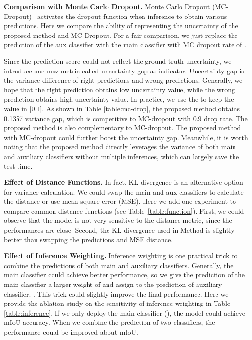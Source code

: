 \noindent\textbf{Comparison with Monte Carlo Dropout.} 
Monte Carlo Dropout (MC-Dropout)~\cite{gal2016dropout} activates the dropout function when inference to obtain various predictions. Here we compare the ability of representing the uncertainty of the proposed method and MC-Dropout. 
For a fair comparison, we just replace the prediction of the aux classifier with the main classifier  with MC dropout rate of .

Since the prediction score could not reflect the ground-truth uncertainty, we introduce one new metric called uncertainty gap as indicator. Uncertainty gap is the variance difference of right predictions and wrong predictions. Generally, we hope that the right prediction obtains low uncertainty value, while the wrong prediction obtains high uncertainty value. In practice, we use the  to keep the value in [0,1]. 
As shown in Table \ref{table:mc-drop}, the proposed method obtains 0.1357 variance gap, which is competitive to MC-dropout with 0.9 drop rate. The proposed method is also complementary to MC-dropout. The proposed method with MC-dropout could further boost the uncertainty gap.  Meanwhile, it is worth noting that the proposed method directly leverages the variance of both main and auxiliary classifiers without multiple inferences, which can largely save the test time. 


\noindent\textbf{Effect of Distance Functions.} In fact, KL-divergence is an alternative option for variance calculation. We could swap the main and aux classifiers to calculate the distance or use mean-square error (MSE). Here we add one experiment to compare common distance functions (see Table~\ref{table:function}). First, we could observe that the model is not very sensitive to the distance metric, since the performances are close. Second, the KL-divergence used in Method is slightly better than swapping the predictions and MSE distance. 


\noindent\textbf{Effect of Inference Weighting.} 
Inference weighting is one practical trick to combine the predictions of both main and auxiliary classifiers. Generally, the main classifier could achieve better performance, so we give the prediction of the main classifier a larger weight of  and assign  to the prediction of auxiliary classifier. . This trick could slightly improve the final performance. Here we provide the ablation study on the sensitivity of inference weighting in Table \ref{table:inference}. If we only deploy the main classifier (), the model could achieve  mIoU accuracy. When we combine the prediction of two classifiers, the performance could be improved about  mIoU.

